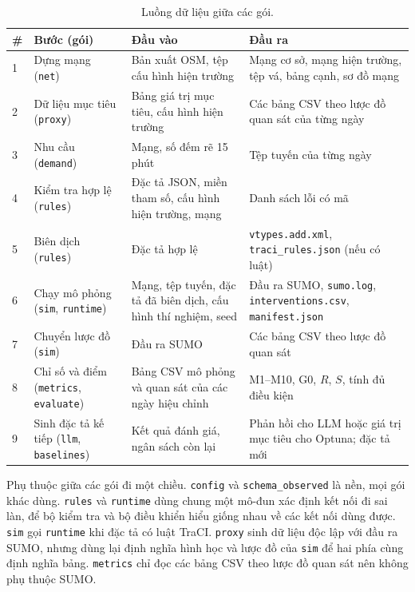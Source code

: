 \documentclass[../main.tex]{subfiles}
\begin{document}
\begin{table}[H]
\centering
\small
\caption{Luồng dữ liệu giữa các gói.} \label{table:4.2}
\begin{tabular}{|p{0.6cm}|p{3.4cm}|p{3.6cm}|p{4.9cm}|}
\hline
\textbf{\#} & \textbf{Bước (gói)} & \textbf{Đầu vào} & \textbf{Đầu ra} \\ \hline
1 & Dựng mạng (\texttt{net}) & Bản xuất OSM, tệp cấu hình hiện trường & Mạng cơ sở, mạng hiện trường, tệp vá, bảng cạnh, sơ đồ mạng \\ \hline
2 & Dữ liệu mục tiêu (\texttt{proxy}) & Bảng giá trị mục tiêu, cấu hình hiện trường & Các bảng CSV theo lược đồ quan sát của từng ngày \\ \hline
3 & Nhu cầu (\texttt{demand}) & Mạng, số đếm rẽ 15 phút & Tệp tuyến của từng ngày \\ \hline
4 & Kiểm tra hợp lệ (\texttt{rules}) & Đặc tả JSON, miền tham số, cấu hình hiện trường, mạng & Danh sách lỗi có mã \\ \hline
5 & Biên dịch (\texttt{rules}) & Đặc tả hợp lệ & \texttt{vtypes.add.xml}, \texttt{traci\_\allowbreak rules.json} (nếu có luật) \\ \hline
6 & Chạy mô phỏng (\texttt{sim}, \texttt{runtime}) & Mạng, tệp tuyến, đặc tả đã biên dịch, cấu hình thí nghiệm, seed & Đầu ra SUMO, \texttt{sumo.log}, \texttt{interventions.csv}, \texttt{manifest.json} \\ \hline
7 & Chuyển lược đồ (\texttt{sim}) & Đầu ra SUMO & Các bảng CSV theo lược đồ quan sát \\ \hline
8 & Chỉ số và điểm (\texttt{metrics}, \texttt{evaluate}) & Bảng CSV mô phỏng và quan sát của các ngày hiệu chỉnh & M1--M10, G0, $R$, $S$, tính đủ điều kiện \\ \hline
9 & Sinh đặc tả kế tiếp (\texttt{llm}, \texttt{baselines}) & Kết quả đánh giá, ngân sách còn lại & Phản hồi cho LLM hoặc giá trị mục tiêu cho Optuna; đặc tả mới \\ \hline
\end{tabular}
\end{table}

Phụ thuộc giữa các gói đi một chiều. \texttt{config} và \texttt{schema\_observed} là nền, mọi gói khác dùng. \texttt{rules} và \texttt{runtime} dùng chung một mô-đun xác định kết nối đi sai làn, để bộ kiểm tra và bộ điều khiển hiểu giống nhau về các kết nối dùng được. \texttt{sim} gọi \texttt{runtime} khi đặc tả có luật TraCI. \texttt{proxy} sinh dữ liệu độc lập với đầu ra SUMO, nhưng dùng lại định nghĩa hình học và lược đồ của \texttt{sim} để hai phía cùng định nghĩa bảng. \texttt{metrics} chỉ đọc các bảng CSV theo lược đồ quan sát nên không phụ thuộc SUMO.
\end{document}
